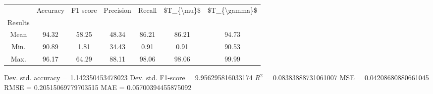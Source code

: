 \begin{tabular}{|c|c|c|c|c|c|c|}
\toprule
{} &  Accuracy &  F1 score &  Precision &  Recall &  \$T\_\{\textbackslash mu\}\$ &  \$T\_\{\textbackslash gamma\}\$ \\
Results &           &           &            &         &            &               \\
\hline
Mean    &     94.32 &     58.25 &      48.34 &   86.21 &      86.21 &         94.73 \\
Min.    &     90.89 &      1.81 &      34.43 &    0.91 &       0.91 &         90.53 \\
Max.    &     96.17 &     64.29 &      88.11 &   98.06 &      98.06 &         99.99 \\
\bottomrule
\end{tabular}

 Dev. std. accuracy = 1.142350453478023
 Dev. std. F1-score = 9.956295816033174
 $R^2$ = 0.08383888731061007
 MSE = 0.04208680880661045
 RMSE = 0.20515069779703515
 MAE = 0.05700394455875092